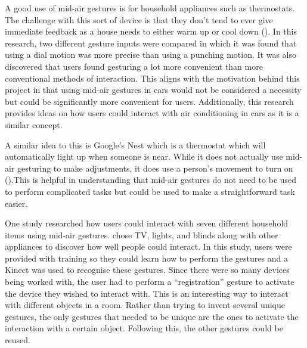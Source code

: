 \documentclass{l4proj}
\begin{document}
A good use of mid-air gestures is for household appliances such as thermostats. The challenge with this sort of device is that they don’t tend to ever give immediate feedback as a house needs to either warm up or cool down (\cite{Freeman_Brewster_Lantz_2015}). In this research, two different gesture inputs were compared in which it was found that using a dial motion was more precise than using a punching motion. It was also discovered that users found gesturing a lot more convenient than more conventional methods of interaction. This aligns with the motivation behind this project in that using mid-air gestures in cars would not be considered a necessity but could be significantly more convenient for users. Additionally, this research provides ideas on how users could interact with air conditioning in cars as it is a similar concept. 

A similar idea to this is Google’s Nest which is a thermostat which will automatically light up when someone is near. While it does not actually use mid-air gesturing to make adjustments, it does use a person’s movement to turn on (\cite{Haselton_2020}).This is helpful in understanding that mid-air gestures do not need to be used to perform complicated tasks but could be used to make a straightforward task easier.

One study researched how users could interact with seven different household items using mid-air gestures. \cite{Vogiatzidakis_Koutsabasis_2020} chose TV, lights, and blinds along with other appliances to discover how well people could interact. In this study, users were provided with training so they could learn how to perform the gestures and a Kinect was used to recognise these gestures. Since there were so many devices being worked with, the user had to perform a “registration” gesture to activate the device they wished to interact with. This is an interesting way to interact with different objects in a room. Rather than trying to invent several unique gestures, the only gestures that needed to be unique are the ones to activate the interaction with a certain object. Following this, the other gestures could be reused. 
\end{document}
